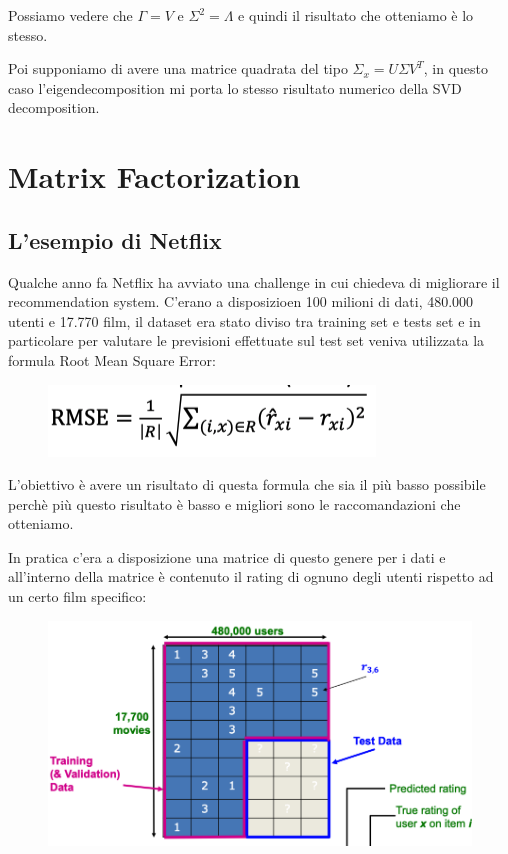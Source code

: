 \documentclass[14pt]{extreport}
\begin{document}
Possiamo vedere che $\Gamma = V$ e $\Sigma^2 = \Lambda$ e quindi il risultato che otteniamo è lo stesso.


Poi supponiamo di avere una matrice quadrata del tipo $\Sigma_x = U \Sigma V^T$, in questo caso l'eigendecomposition mi porta lo stesso risultato
numerico della SVD decomposition.



\section{Matrix Factorization}

\subsection{L'esempio di Netflix}

Qualche anno fa Netflix ha avviato una challenge in cui chiedeva di migliorare il recommendation system. C'erano a disposizioen 100 milioni di dati,
480.000 utenti e 17.770 film, il dataset era stato diviso tra training set e tests set e in particolare per valutare le previsioni effettuate sul test
set veniva utilizzata la formula Root Mean Square Error:


\begin{figure}[H]
	\centering
	\includegraphics[width=0.7\linewidth]{511.jpeg}
\end{figure}

L'obiettivo è avere un risultato di questa formula che sia il più basso possibile perchè più questo risultato è basso e migliori sono le
raccomandazioni che otteniamo.

In pratica c'era a disposizione una matrice di questo genere per i dati e all'interno della matrice è contenuto il rating di ognuno degli utenti
rispetto ad un certo film specifico:

\begin{figure}[H]
	\centering
	\includegraphics[width=0.7\linewidth]{512.jpeg}
\end{figure}
\end{document}
